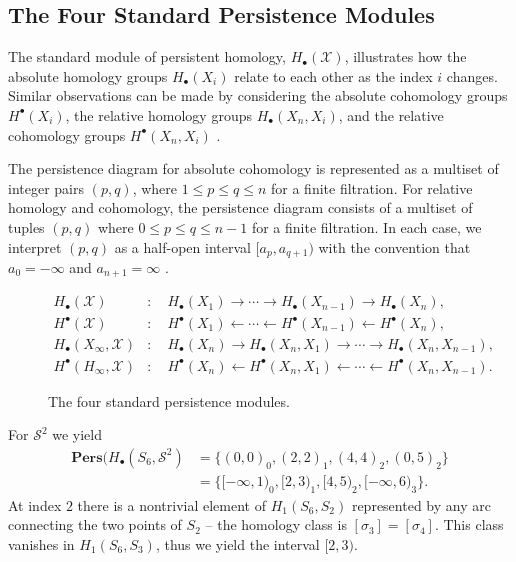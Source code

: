 \subsection{The Four Standard Persistence Modules}
\label{standardpersistencemodules} The standard module of persistent homology, $H
_{\bullet}(\mathcal{X})$, illustrates how the absolute homology groups
$H_{\bullet}(X_{i})$ relate to each other as the index $i$ changes. Similar observations
can be made by considering the absolute cohomology groups $H^{\bullet}(X_{i})$,
the relative homology groups $H_{\bullet}(X_{n}, X_{i})$, and the relative cohomology
groups $H^{\bullet}(X_{n}, X_{i})$ \cite[\S 2.4]{de2011dualities}.

The persistence diagram for absolute cohomology is represented as a multiset of integer
pairs $(p,q)$, where $1 \leq p \leq q \leq n$ for a finite filtration. For relative
homology and cohomology, the persistence diagram consists of a multiset of
tuples $(p,q)$ where $0 \leq p \leq q \leq n-1$ for a finite filtration. In each
case, we interpret $(p,q)$ as a half-open interval $[a_{p}, a_{q+1})$ with the
convention that $a_{0} = -\infty$ and $a_{n+1}= \infty$
\cite[\S 2.4]{de2011dualities}.

\begin{figure}
	\begin{align*}
		H_{\bullet}(\mathcal{X})             & : \quad H_{\bullet}(X_{1}) \rightarrow \cdots \rightarrow H_{\bullet}(X_{n-1}) \rightarrow H_{\bullet}(X_{n}),             \\
		H^{\bullet}(\mathcal{X})             & : \quad H^{\bullet}(X_{1}) \leftarrow \cdots \leftarrow H^{\bullet}(X_{n-1}) \leftarrow H^{\bullet}(X_{n}),                \\
		H_{\bullet}(X_{\infty}, \mathcal{X}) & : \quad H_{\bullet}(X_{n}) \rightarrow H_{\bullet}(X_{n},X_{1}) \rightarrow \cdots \rightarrow H_{\bullet}(X_{n},X_{n-1}), \\
		H^{\bullet}(H_{\infty}, \mathcal{X}) & : \quad H^{\bullet}(X_{n}) \leftarrow H^{\bullet}(X_{n},X_{1}) \leftarrow \cdots \leftarrow H^{\bullet}(X_{n}, X_{n-1}).
	\end{align*}
	\caption{The four standard persistence modules.}
\end{figure}

\begin{example}
	For $\mathcal{S}^{2}$ we yield
	\begin{align}
		\textbf{Pers}(H_{\bullet}(S_{6},\mathcal{S}^{2}) & = \{(0,0)_{0}, (2,2)_{1}, (4,4)_{2}, (0,5)_{2}\}               \\
		                                                 & = \{[-\infty, 1)_{0}, [2,3)_{1}, [4,5)_{2}, [-\infty,6)_{3}\}.
	\end{align}
	At index $2$ there is a nontrivial element of $H_{1}(S_{6},S_{2})$ represented
	by any arc connecting the two points of $S_{2}$ \cite[\S 2.4]{de2011dualities} --
	the homology class is $[\sigma_{3}] = [\sigma_{4}]$. This class vanishes in $H_{1}
	(S_{6},S_{3})$, thus we yield the interval $[2,3)$.
\end{example}

